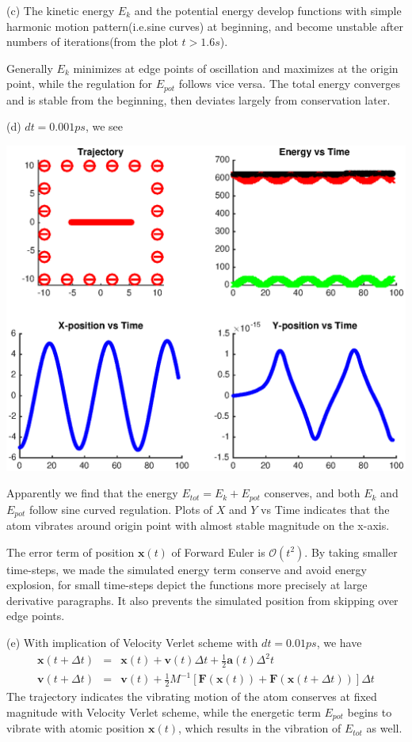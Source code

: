 \documentclass{article}
\begin{document}
\noindent
(c) The kinetic energy $E_k$ and the potential energy develop functions with simple harmonic motion pattern(i.e.sine curves) at beginning, and become unstable after numbers of iterations(from the plot $t>1.6s$). 

Generally $E_k$ minimizes at edge points of oscillation and maximizes at the origin point, while the regulation for $E_{pot}$ follows vice versa. The total energy converges and is stable from the beginning, then deviates largely from conservation later.

\vspace{4mm}
\noindent
(d) $dt=0.001ps$, we see

\begin{center}
{\includegraphics[scale=0.76]{2.eps}}
\end{center}

Apparently we find that the energy $E_{tot} = E_{k} + E_{pot}$ conserves, and both $E_k$ and $E_{pot}$ follow sine curved regulation. Plots of $X$ and $Y$ vs Time indicates that the atom vibrates around origin point with almost stable magnitude on the x-axis.

The error term of position $\mathbf{x}(t)$ of Forward Euler is $\mathcal{O}(t^2)$. By taking smaller time-steps, we made the simulated energy term conserve and avoid energy explosion, for small time-steps depict the functions more precisely at large derivative paragraphs. It also prevents the simulated position from skipping over edge points.

\vspace{4mm}
\noindent
(e) With implication of Velocity Verlet scheme with $dt=0.01ps$, we have
\begin{eqnarray*}
\mathbf{x}(t+\Delta t) &=& \mathbf{x}(t) + \mathbf{v}(t)\Delta t + \frac{1}{2}\mathbf{a}(t)\Delta^2 t\\
\mathbf{v}(t+\Delta t) &=& \mathbf{v}(t) +\frac{1}{2} M^{-1}[\mathbf{F}(\mathbf{x}(t))+\mathbf{F}(\mathbf{x}(t+\Delta t))]\Delta t
\end{eqnarray*}
The trajectory indicates the vibrating motion of the atom conserves at fixed magnitude with Velocity Verlet scheme, while the energetic term $E_{pot}$ begins to vibrate with atomic position $\mathbf{x}(t)$, which results in the vibration of $E_{tot}$ as well. 
\end{document}
